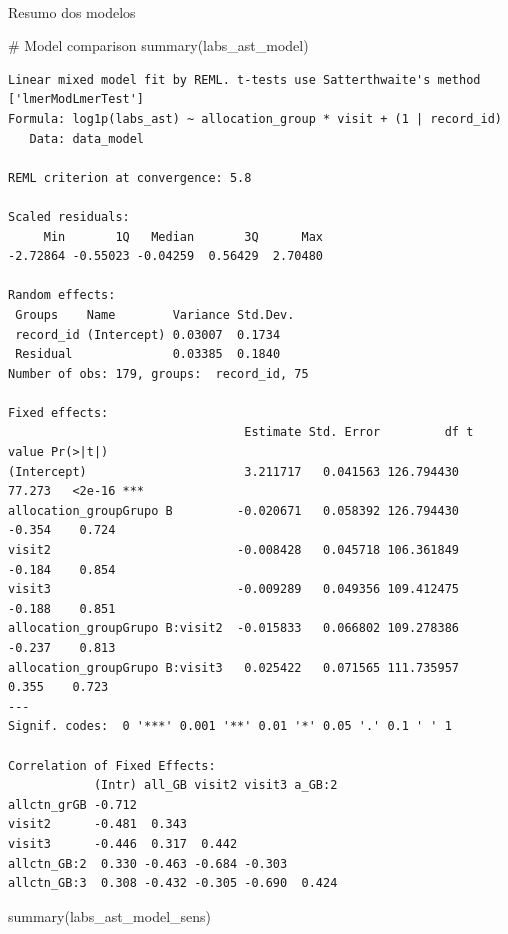 \documentclass[
  12pt,
]{article}
\makeatletter
\let\oldparagraph\paragraph
\renewcommand{\paragraph}{
    \@ifstar
      \xxxParagraphStar
      \xxxParagraphNoStar
  }
\newcommand{\xxxParagraphStar}[1]{\oldparagraph*{#1}\mbox{}}
\newcommand{\xxxParagraphNoStar}[1]{\oldparagraph{#1}\mbox{}}
\newenvironment{Shaded}{\begin{snugshade}}{\end{snugshade}}
\newcommand{\CommentTok}[1]{\textcolor[rgb]{0.37,0.37,0.37}{#1}}
\newcommand{\FunctionTok}[1]{\textcolor[rgb]{0.28,0.35,0.67}{#1}}
\newcommand{\NormalTok}[1]{\textcolor[rgb]{0.00,0.23,0.31}{#1}}
\makeatother
\begin{document}
\paragraph{Resumo dos modelos}\label{resumo-dos-modelos}

\begin{Shaded}
\begin{Highlighting}[]
\CommentTok{\# Model comparison}
\FunctionTok{summary}\NormalTok{(labs\_ast\_model)}
\end{Highlighting}
\end{Shaded}

\begin{verbatim}
Linear mixed model fit by REML. t-tests use Satterthwaite's method ['lmerModLmerTest']
Formula: log1p(labs_ast) ~ allocation_group * visit + (1 | record_id)
   Data: data_model

REML criterion at convergence: 5.8

Scaled residuals: 
     Min       1Q   Median       3Q      Max 
-2.72864 -0.55023 -0.04259  0.56429  2.70480 

Random effects:
 Groups    Name        Variance Std.Dev.
 record_id (Intercept) 0.03007  0.1734  
 Residual              0.03385  0.1840  
Number of obs: 179, groups:  record_id, 75

Fixed effects:
                                 Estimate Std. Error         df t value Pr(>|t|)    
(Intercept)                      3.211717   0.041563 126.794430  77.273   <2e-16 ***
allocation_groupGrupo B         -0.020671   0.058392 126.794430  -0.354    0.724    
visit2                          -0.008428   0.045718 106.361849  -0.184    0.854    
visit3                          -0.009289   0.049356 109.412475  -0.188    0.851    
allocation_groupGrupo B:visit2  -0.015833   0.066802 109.278386  -0.237    0.813    
allocation_groupGrupo B:visit3   0.025422   0.071565 111.735957   0.355    0.723    
---
Signif. codes:  0 '***' 0.001 '**' 0.01 '*' 0.05 '.' 0.1 ' ' 1

Correlation of Fixed Effects:
            (Intr) all_GB visit2 visit3 a_GB:2
allctn_grGB -0.712                            
visit2      -0.481  0.343                     
visit3      -0.446  0.317  0.442              
allctn_GB:2  0.330 -0.463 -0.684 -0.303       
allctn_GB:3  0.308 -0.432 -0.305 -0.690  0.424
\end{verbatim}

\begin{Shaded}
\begin{Highlighting}[]
\FunctionTok{summary}\NormalTok{(labs\_ast\_model\_sens)}
\end{Highlighting}
\end{Shaded}
\end{document}
